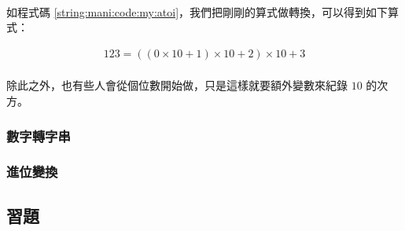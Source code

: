\documentclass[12pt,a4paper,oneside]{report}
\begin{document}
\begin{CJK}{UTF8}{bkai}
\paragraph{}如程式碼 \ref{string:mani:code:my:atoi}，我們把剛剛的算式做轉換，可以得到如下算式：

\begin{align*}
123={({(0\times{10}+1)}\times{10}+2)}\times{10}+3
\end{align*}

\paragraph{}除此之外，也有些人會從個位數開始做，只是這樣就要額外變數來紀錄 $10$ 的次方。

\subsubsection{數字轉字串}

\subsubsection{進位變換}

\subsection{習題}

\ifx \allfiles \undefined

\printindex

\clearpage
\end{CJK}
\end{document}
